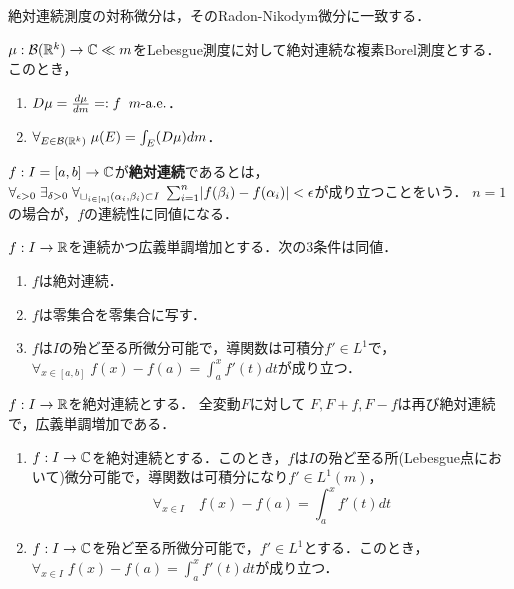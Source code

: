 \documentclass[uplatex,dvipdfmx]{jsreport}
\begin{document}
\begin{tcolorbox}[colframe=ForestGreen, colback=ForestGreen!10!white,breakable,colbacktitle=ForestGreen!40!white,coltitle=black,fonttitle=\bfseries\sffamily,
title=]
    絶対連続測度の対称微分は，そのRadon-Nikodym微分に一致する．
\end{tcolorbox}

\begin{theorem}
    $\mu:\mathcal{B}(\mathbb{R}^k)\to\mathbb{C}\ll m$をLebesgue測度に対して絶対連続な複素Borel測度とする．
    このとき，
    \begin{enumerate}
        \item $D\mu =\frac{d \mu}{d m}=:f\;\;m\text{-a.e.}$．
        \item $\forall_{E\in\mathcal{B}(\mathbb{R}^k)}\;\mu(E)=\int_E(D\mu)dm$．
    \end{enumerate}
\end{theorem}

\begin{definition}
    $f:I=[a,b]\to\mathbb{C}$が\textbf{絶対連続}であるとは，$\forall_{\epsilon>0}\;\exists_{\delta>0}\;\forall_{\sqcup_{i\in[n]}(\alpha_i,\beta_i)\subset I}\;\sum^n_{i=1}\lvert f(\beta_i)-f(\alpha_i)\rvert<\epsilon$が成り立つことをいう．
    $n=1$の場合が，$f$の連続性に同値になる．
\end{definition}

\begin{theorem}[絶対連続性の特徴付け]
    $f:I\to\mathbb{R}$を連続かつ広義単調増加とする．次の3条件は同値．
    \begin{enumerate}
        \item $f$は絶対連続．
        \item $f$は零集合を零集合に写す．
        \item $f$は$I$の殆ど至る所微分可能で，導関数は可積分$f'\in L^1$で，$\forall_{x\in[a,b]}\;f(x)-f(a)=\int^x_af'(t)dt$が成り立つ．
    \end{enumerate}
\end{theorem}

\begin{theorem}[絶対連続関数の全変動]
    $f:I\to\mathbb{R}$を絶対連続とする．
    全変動$F$に対して
    $F,F+f,F-f$は再び絶対連続で，広義単調増加である．
\end{theorem}

\begin{theorem}[微積分の基本定理]\mbox{}
    \begin{enumerate}
        \item $f:I\to\mathbb{C}$を絶対連続とする．このとき，$f$は$I$の殆ど至る所(Lebesgue点において)微分可能で，導関数は可積分になり$f'\in L^1(m)$，
        \[\forall_{x\in I}\quad f(x)-f(a)=\int^x_af'(t)dt\]
        \item $f:I\to\mathbb{C}$を殆ど至る所微分可能で，$f'\in L^1$とする．このとき，$\forall_{x\in I}\;f(x)-f(a)=\int^x_af'(t)dt$が成り立つ．
    \end{enumerate}
\end{theorem}
\end{document}
